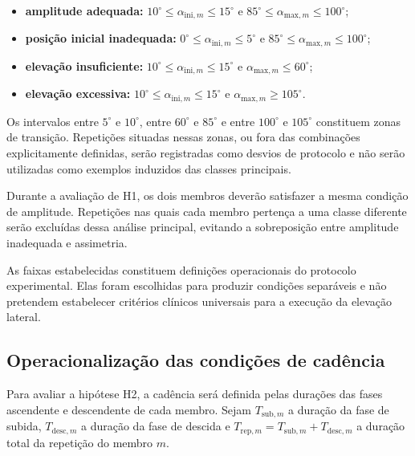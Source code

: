 \begin{itemize}
    \item \textbf{amplitude adequada:}
    $10^\circ \leq \alpha_{\mathrm{ini},m} \leq 15^\circ$ e
    $85^\circ \leq \alpha_{\mathrm{max},m} \leq 100^\circ$;

    \item \textbf{posição inicial inadequada:}
    $0^\circ \leq \alpha_{\mathrm{ini},m} \leq 5^\circ$ e
    $85^\circ \leq \alpha_{\mathrm{max},m} \leq 100^\circ$;

    \item \textbf{elevação insuficiente:}
    $10^\circ \leq \alpha_{\mathrm{ini},m} \leq 15^\circ$ e
    $\alpha_{\mathrm{max},m} \leq 60^\circ$;

    \item \textbf{elevação excessiva:}
    $10^\circ \leq \alpha_{\mathrm{ini},m} \leq 15^\circ$ e
    $\alpha_{\mathrm{max},m} \geq 105^\circ$.
\end{itemize}

Os intervalos entre $5^\circ$ e $10^\circ$, entre $60^\circ$ e
$85^\circ$ e entre $100^\circ$ e $105^\circ$ constituem zonas de
transição. Repetições situadas nessas zonas, ou fora das combinações
explicitamente definidas, serão registradas como desvios de protocolo e
não serão utilizadas como exemplos induzidos das classes principais.

Durante a avaliação de H1, os dois membros deverão satisfazer a mesma
condição de amplitude. Repetições nas quais cada membro pertença a uma
classe diferente serão excluídas dessa análise principal, evitando a
sobreposição entre amplitude inadequada e assimetria.

As faixas estabelecidas constituem definições operacionais do protocolo
experimental. Elas foram escolhidas para produzir condições separáveis e
não pretendem estabelecer critérios clínicos universais para a execução
da elevação lateral.

\subsection{Operacionalização das condições de cadência}
\label{subsec:operacionalizacao-cadencia}

Para avaliar a hipótese H2, a cadência será definida pelas durações das
fases ascendente e descendente de cada membro. Sejam
$T_{\mathrm{sub},m}$ a duração da fase de subida,
$T_{\mathrm{desc},m}$ a duração da fase de descida e
$T_{\mathrm{rep},m}=T_{\mathrm{sub},m}+T_{\mathrm{desc},m}$ a duração
total da repetição do membro $m$.

